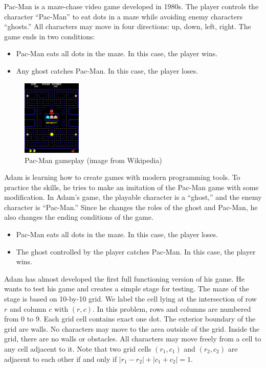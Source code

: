 Pac-Man is a maze-chase video game developed in 1980s. 
The player controls the character ``Pac-Man'' to eat dots in a maze while
avoiding enemy characters ``ghosts.'' 
All characters may move in four directions: up, down, left, right.
The game ends in two conditions:
\begin{itemize}
\tightlist
\item Pac-Man eats all dots in the maze. In this case, the player wins.
\item Any ghost catches Pac-Man. In this case, the player loses.
\end{itemize}

\begin{figure}[h]
\center
\includegraphics[width=0.25\textwidth]{image/pacman.png}
\caption{Pac-Man gameplay (image from Wikipedia)}
\end{figure}

Adam is learning how to create games with modern programming tools.
To practice the skills, he tries to make an imitation of the Pac-Man 
game with some modification.
In Adam's game, the playable character is a ``ghost,'' 
and the enemy character is ``Pac-Man.'' 
Since he changes the roles of the ghost and Pac-Man, 
he also changes the ending conditions of the game.
\begin{itemize}
\tightlist
\item Pac-Man eats all dots in the maze. In this case, the player loses.
\item The ghost controlled by the player catches Pac-Man. In this case, the player wins.
\end{itemize}

Adam has almost developed the first full functioning version of his game.
He wants to test his game and creates a simple stage for testing.
The maze of the stage is based on 10-by-10 grid. 
We label the cell lying at the intersection of row $r$ and column $c$ with 
$(r,c)$. In this problem, rows and columns are numbered from $0$ to $9$.
Each grid cell contains exact one dot.
The exterior boundary of the grid are walls. 
No characters may move to the area outside of the grid.
Inside the grid, there are no walls or obstacles.
All characters may move freely from a cell to any cell adjacent to it.
Note that two grid cells $(r_1,c_1)$ and $(r_2,c_2)$ are adjacent to each other 
if and only if $|r_1-r_2|+|c_1+c_2|=1$.
 
